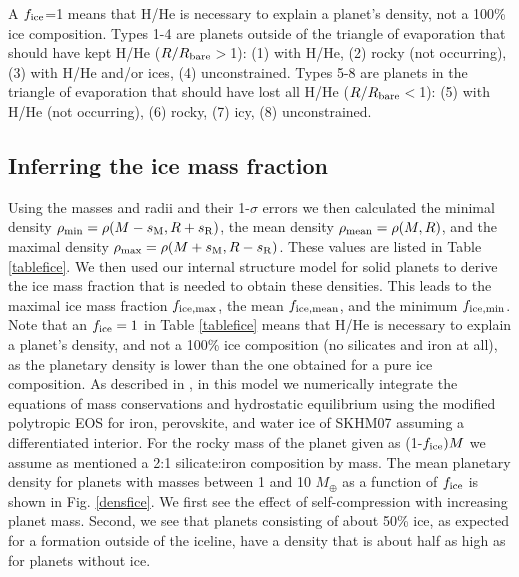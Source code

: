 \documentclass[]{emulateapj}
\def\mearth{M_{\oplus}}
\begin{document}
\begin{table*}[h]
\begin{center}
{\begin{tabular}{lcccccccc|ccc|cc}
 \end{tabular}
 }
\end{center}
{\footnotesize A $f_{\rm ice}$=1 means that H/He is necessary to explain a planet's density, not a 100\% ice composition. Types 1-4 are planets outside of the triangle of evaporation that should have kept H/He ($R/R_{\rm bare}$$>$1): (1) with H/He, (2) rocky (not occurring), (3) with H/He and/or ices, (4) unconstrained. Types 5-8 are planets in the triangle of evaporation  that should have lost all H/He ($R/R_{ \rm bare}$$<$1): (5) with H/He (not occurring), (6) rocky, (7) icy, (8) unconstrained.}
\label{tablefice}
\end{table*}%

\subsection{{Inferring the ice mass fraction}}
Using the masses and radii and their 1-$\sigma$ errors we then calculated the minimal density $\rho_{\rm min}=\rho(M-s_{\rm M},R+s_{\rm R})$, the mean density $\rho_{\rm mean}=\rho(M,R)$, and the maximal density $\rho_{\rm max}=\rho(M+s_{\rm M},R-s_{\rm R})$. These values are listed in Table \ref{tablefice}. We then used our internal structure model for solid planets \citep{Mordasini2012b} to derive the ice mass fraction that is needed to obtain these densities. This leads to the maximal ice mass fraction $f_{\rm ice,max}$, the mean $f_{\rm ice,mean}$, and the minimum $f_{\rm ice,min}$. Note that an $f_{\rm ice}=1$ in Table \ref{tablefice} means that H/He is necessary to explain a planet's density, and not a 100\% ice composition (no silicates and iron at all), as the planetary density is lower than the one obtained for a pure ice composition. As described in \citet{Mordasini2012b}, in this model we numerically integrate the equations of mass conservations and hydrostatic equilibrium using the modified polytropic EOS for iron, perovskite, and water ice of SKHM07 assuming a differentiated interior. For the rocky mass of the planet given as (1-$f_{\rm ice}) M $ we assume as mentioned a 2:1 silicate:iron composition by mass. The mean planetary density for planets with masses between 1 and 10 $\mearth$ as a function of $f_{\rm ice}$ is shown in Fig. \ref{densfice}. We first see the effect of self-compression with increasing planet mass. Second, we see that planets consisting of about 50\% ice, as expected for a formation outside of the iceline, have a density that is about half as high as for planets without ice. 
\end{document}
